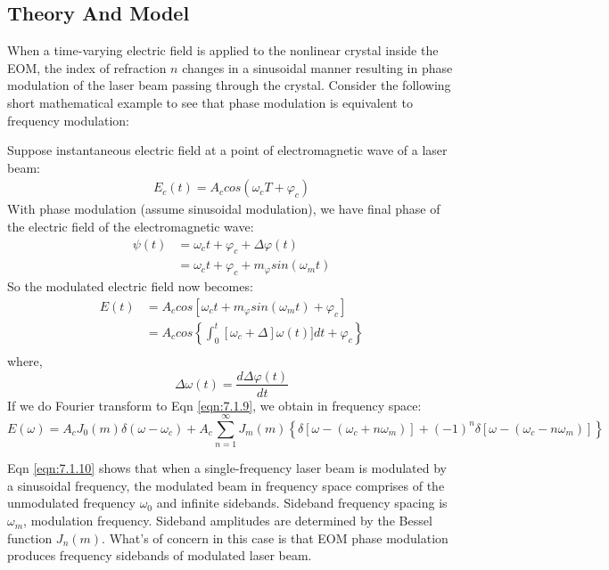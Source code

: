 \documentclass[12pt]{report}
\begin{document}
\subsection{Theory And Model}
When a time-varying electric field is applied to the nonlinear crystal inside the EOM, the index of refraction $n$ changes in a sinusoidal manner resulting in phase modulation of the laser beam passing through the crystal. Consider the following short mathematical example to see that phase modulation is equivalent to frequency modulation: 
\par
Suppose instantaneous electric field at a point of electromagnetic wave of a laser beam: 
\begin{align*}
    E_c(t) = A_c cos(\omega_c T + \varphi_c)
\end{align*}
With phase modulation (assume sinusoidal modulation), we have final phase of the electric field of the electromagnetic wave: 
\begin{align*}
    \psi(t) &= \omega_c t + \varphi_c + \Delta \varphi (t) \\
            &= \omega_c t + \varphi_c + m_{\varphi} sin(\omega_m t)
\end{align*}
So the modulated electric field now becomes: 
\begin{align}
    E(t) &= A_c cos[ \omega_c t + m_{\varphi} sin(\omega_m t) + \varphi_c] \label{eqn:7.1.9}\\
         &= A_c cos\left\{  \int_0^t [ \omega_c + \Delta ]\omega(t)] dt + \varphi_c \right\} \\
\end{align}
where, 
\begin{equation*}
    \Delta \omega (t) = \frac{d\Delta \varphi (t)}{dt}
\end{equation*}
If we do Fourier transform to Eqn \ref{eqn:7.1.9}, we obtain in frequency space: 
\begin{equation}
    E(\omega) = A_c J_0(m) \delta(\omega - \omega_c) + A_c\sum_{n=1}^\infty J_m(m) \left\{ \delta[\omega-(\omega_c + n\omega_m)] +(-1)^n\delta[\omega-(\omega_c-n\omega_m)]\right\}
    \label{eqn:7.1.10}
\end{equation}

Eqn \ref{eqn:7.1.10} shows that when a single-frequency laser beam is modulated by a sinusoidal frequency, the modulated beam in frequency space comprises of the unmodulated frequency $\omega_0$ and infinite sidebands. Sideband frequency spacing is $\omega_m$, modulation frequency. 
Sideband amplitudes are determined by the Bessel function $J_n(m)$. What's of concern in this case is that EOM phase modulation produces frequency sidebands of modulated laser beam. 
\end{document}
